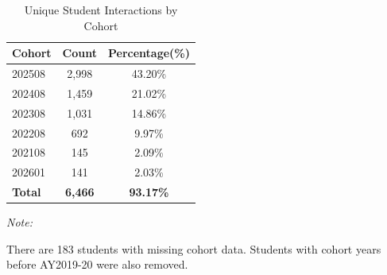 \documentclass[
  letterpaper,
  DIV=11,
  numbers=noendperiod]{scrartcl}
\begin{document}
\begin{table}[!h]
\centering
\caption{\label{tab:ClssStndUtGE}Unique Student Interactions by Class Standing}
\centering
{}
\end{table}

\begin{table}[!h]
\centering
\caption{\label{tab:ChrtTblGE}Unique Student Interactions by Cohort}
\centering
\fontsize{10}{12}\selectfont
\begin{threeparttable}
\begin{tabular}[t]{lcc}
\toprule
\textbf{Cohort} & \textbf{Count} & \textbf{Percentage(\%)}\\
\midrule
202508 & 2,998 & 43.20\%\\
202408 & 1,459 & 21.02\%\\
202308 & 1,031 & 14.86\%\\
202208 & 692 & 9.97\%\\
202108 & 145 & 2.09\%\\
202601 & 141 & 2.03\%\\
\midrule
\textbf{Total} & \textbf{6,466} & \textbf{93.17\%}\\
\bottomrule
\end{tabular}
\begin{tablenotes}
\item \textit{Note: } 
\item There are 183 students with missing cohort data. Students with cohort years before AY2019-20 were also removed.
\end{tablenotes}
\end{threeparttable}
\end{table}
\end{document}
